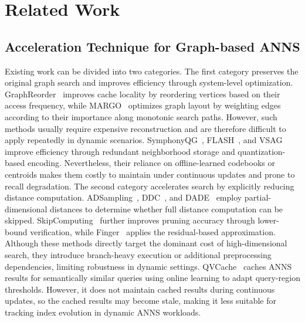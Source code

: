 \section{Related Work}
\subsection{Acceleration Technique for Graph-based ANNS}
Existing work can be divided into two categories. The first category preserves the original graph search and improves efficiency through system-level optimization. GraphReorder~\cite{Coleman202238488} improves cache locality by reordering vertices based on their access frequency, while MARGO~\cite{Yue20254337} optimizes graph layout by weighting edges according to their importance along monotonic search paths. However, such methods usually require expensive reconstruction and are therefore difficult to apply repeatedly in dynamic scenarios. SymphonyQG~\cite{Gou2025}, FLASH~\cite{Wang2025}, and VSAG~\cite{Zhong20255017} improve efficiency through redundant neighborhood storage and quantization-based encoding. Nevertheless, their reliance on offline-learned codebooks or centroids makes them costly to maintain under continuous updates and prone to recall degradation. The second category accelerates search by explicitly reducing distance computation. 
ADSampling~\cite{Gao202327}, DDC~\cite{Yang20251098}, and DADE~\cite{Deng2024812} employ partial-dimensional distances to determine whether full distance computation can be skipped. 
SkipComputing~\cite{Song2025} further improves pruning accuracy through lower-bound verification, while Finger~\cite{Chen20233225} applies the residual-based approximation. Although these methods directly target the dominant cost of high-dimensional search, they introduce branch-heavy execution or additional preprocessing dependencies, limiting robustness in dynamic settings. QVCache~\cite{gocer2026qvcachequeryawarevectorcache} caches ANNS results for semantically similar queries using online learning to adapt query-region thresholds. However, it does not maintain cached results during continuous updates, so the cached results may become stale, making it less suitable for tracking index evolution in dynamic ANNS workloads.





